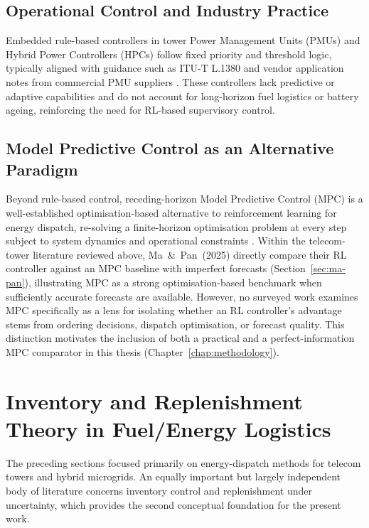 \subsection{Operational Control and Industry Practice}

Embedded rule-based controllers in tower Power Management Units (PMUs) and
Hybrid Power Controllers (HPCs) follow fixed priority and threshold logic,
typically aligned with guidance such as ITU-T L.1380 and vendor application
notes from commercial PMU suppliers \citep{itut_l1380_green_ict,asentria_pmu_2023}.
These controllers lack predictive or adaptive capabilities and do not account
for long-horizon fuel logistics or battery ageing, reinforcing the need for
RL-based supervisory control.

\subsection{Model Predictive Control as an Alternative Paradigm}

Beyond rule-based control, receding-horizon Model Predictive Control (MPC)
is a well-established optimisation-based alternative to reinforcement
learning for energy dispatch, re-solving a finite-horizon optimisation
problem at every step subject to system dynamics and operational
constraints \citep{camacho2007model}. Within the telecom-tower literature reviewed above,
Ma~\&~Pan~(2025) directly compare their RL controller
against an MPC baseline with imperfect forecasts
(Section~\ref{sec:ma-pan}), illustrating MPC as a strong
optimisation-based benchmark when sufficiently accurate forecasts are
available. However, no surveyed work examines MPC specifically as a lens
for isolating whether an RL controller's advantage stems from ordering
decisions, dispatch optimisation, or forecast quality. This distinction
motivates the inclusion of both a practical and a perfect-information MPC
comparator in this thesis (Chapter~\ref{chap:methodology}).

\section{Inventory and Replenishment Theory in Fuel/Energy Logistics}

The preceding sections focused primarily on energy-dispatch methods for
telecom towers and hybrid microgrids. An equally important but largely
independent body of literature concerns inventory control and
replenishment under uncertainty, which provides the second conceptual
foundation for the present work.

